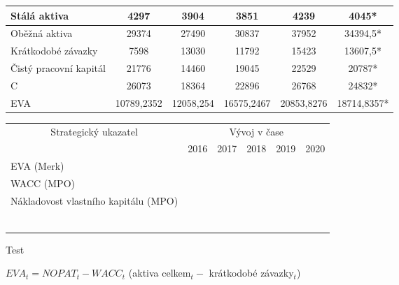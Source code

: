 \begin{table}[]
\begin{tabular}{|l|ccccc|}
Stálá aktiva & \multicolumn{1}{c|}{4297} & \multicolumn{1}{c|}{3904} & \multicolumn{1}{c|}{3851} & \multicolumn{1}{c|}{4239} & 4045* \\ \hline
Oběžná aktiva & \multicolumn{1}{c|}{29374} & \multicolumn{1}{c|}{27490} & \multicolumn{1}{c|}{30837} & \multicolumn{1}{c|}{37952} & 34394,5* \\ \hline
Krátkodobé závazky & \multicolumn{1}{c|}{7598} & \multicolumn{1}{c|}{13030} & \multicolumn{1}{c|}{11792} & \multicolumn{1}{c|}{15423} & 13607,5* \\ \hline
Čistý pracovní kapitál & \multicolumn{1}{c|}{21776} & \multicolumn{1}{c|}{14460} & \multicolumn{1}{c|}{19045} & \multicolumn{1}{c|}{22529} & 20787* \\ \hline
C & \multicolumn{1}{c|}{26073} & \multicolumn{1}{c|}{18364} & \multicolumn{1}{c|}{22896} & \multicolumn{1}{c|}{26768} & 24832* \\ \hline
\rowcolor[HTML]{C0C0C0} 
EVA & \multicolumn{1}{c|}{\cellcolor[HTML]{C0C0C0}10789,2352} & \multicolumn{1}{c|}{\cellcolor[HTML]{C0C0C0}12058,254} & \multicolumn{1}{c|}{\cellcolor[HTML]{C0C0C0}16575,2467} & \multicolumn{1}{c|}{\cellcolor[HTML]{C0C0C0}20853,8276} & 18714,8357* \\ \hline
\end{tabular}
\end{table}

\begin{table}[!htbp]
\begin{tabular}{llllll}
\hline
\multicolumn{1}{|c|}{\multirow{2}{*}{Strategický ukazatel}} & \multicolumn{5}{c|}{Vývoj v čase} \\ \cline{2-6} 
\multicolumn{1}{|c|}{} & \multicolumn{1}{c|}{2016} & \multicolumn{1}{c|}{2017} & \multicolumn{1}{c|}{2018} & \multicolumn{1}{c|}{2019} & \multicolumn{1}{c|}{2020} \\ \hline
\multicolumn{1}{|l|}{EVA (Merk)} & \multicolumn{1}{l|}{} & \multicolumn{1}{l|}{} & \multicolumn{1}{l|}{} & \multicolumn{1}{l|}{} & \multicolumn{1}{l|}{} \\ \hline
\multicolumn{1}{|l|}{WACC (MPO)} & \multicolumn{1}{l|}{} & \multicolumn{1}{l|}{} & \multicolumn{1}{l|}{} & \multicolumn{1}{l|}{} & \multicolumn{1}{l|}{} \\ \hline
\multicolumn{1}{|l|}{Nákladovost vlastního kapitálu (MPO)} & \multicolumn{1}{l|}{} & \multicolumn{1}{l|}{} & \multicolumn{1}{l|}{} & \multicolumn{1}{l|}{} & \multicolumn{1}{l|}{} \\ \hline
 &  &  &  &  &  \\
 &  &  &  &  &  \\
 &  &  &  &  &  \\
 &  &  &  &  &  \\
 &  &  &  &  &  \\
 &  &  &  &  & 
\end{tabular}
\end{table}

Test 

$EVA_t = NOPAT_t - WACC_t$ (aktiva celkem$_t -$ krátkodobé závazky$_t$)

